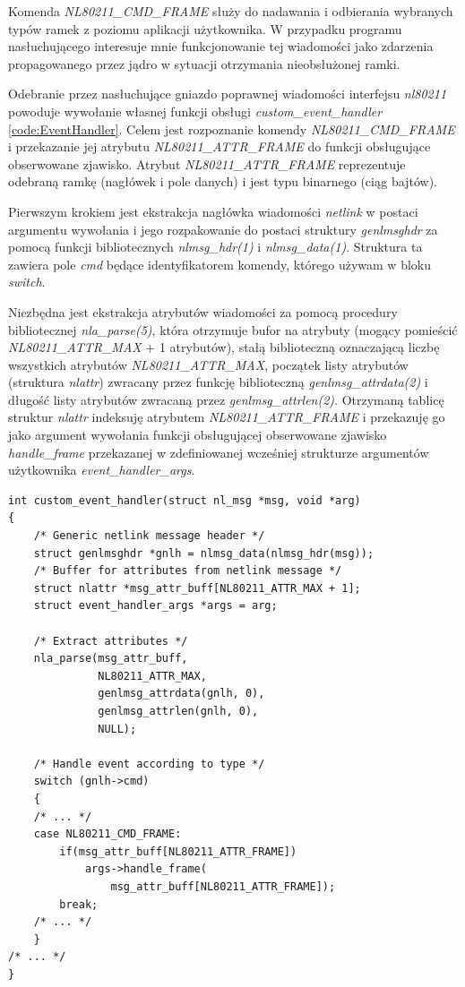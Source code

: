 Komenda \emph{NL80211\_CMD\_FRAME} służy do nadawania i odbierania wybranych typów ramek z poziomu aplikacji użytkownika. W przypadku programu nasłuchującego interesuje mnie funkcjonowanie tej wiadomości jako zdarzenia propagowanego przez jądro w sytuacji otrzymania nieobsłużonej ramki. 

Odebranie przez nasłuchujące gniazdo poprawnej wiadomości interfejsu \emph{nl80211} powoduje wywołanie własnej funkcji obsługi \emph{custom\_event\_handler} \ref{code:EventHandler}. Celem jest rozpoznanie komendy \emph{NL80211\_CMD\_FRAME} i przekazanie jej atrybutu \emph{NL80211\_ATTR\_FRAME} do funkcji obsługujące obserwowane zjawisko. Atrybut \emph{NL80211\_ATTR\_FRAME} reprezentuje odebraną ramkę (nagłówek i pole danych) i jest typu binarnego (ciąg bajtów). 

Pierwszym krokiem jest ekstrakcja nagłówka wiadomości \emph{netlink} w postaci argumentu wywołania i jego rozpakowanie  do postaci struktury \emph{genlmsghdr} za pomocą funkcji bibliotecznych \emph{nlmsg\_hdr(1)} i \emph{nlmsg\_data(1)}. Struktura ta zawiera pole \emph{cmd} będące identyfikatorem komendy, którego używam w bloku \emph{switch}.

Niezbędna jest ekstrakcja atrybutów wiadomości za pomocą procedury bibliotecznej \emph{nla\_parse(5)}, która otrzymuje bufor na atrybuty (mogący pomieścić \emph{NL80211\_ATTR\_MAX} + 1 atrybutów), stałą biblioteczną oznaczającą liczbę wszystkich atrybutów \emph{NL80211\_ATTR\_MAX}, początek listy atrybutów (struktura \emph{nlattr}) zwracany przez funkcję biblioteczną \emph{genlmsg\_attrdata(2)} i długość listy atrybutów zwracaną przez \emph{genlmsg\_attrlen(2)}. Otrzymaną tablicę struktur \emph{nlattr} indeksuję atrybutem \emph{NL80211\_ATTR\_FRAME} i przekazuję go jako argument wywołania funkcji obsługującej obserwowane zjawisko \emph{handle\_frame} przekazanej w zdefiniowanej wcześniej strukturze argumentów użytkownika \emph{event\_handler\_args}. 

\begin{lstlisting}[frame=tb]
int custom_event_handler(struct nl_msg *msg, void *arg)
{
    /* Generic netlink message header */
    struct genlmsghdr *gnlh = nlmsg_data(nlmsg_hdr(msg));
    /* Buffer for attributes from netlink message */
    struct nlattr *msg_attr_buff[NL80211_ATTR_MAX + 1];
    struct event_handler_args *args = arg;
        
    /* Extract attributes */
    nla_parse(msg_attr_buff, 
              NL80211_ATTR_MAX, 
              genlmsg_attrdata(gnlh, 0), 
              genlmsg_attrlen(gnlh, 0), 
              NULL);
        
    /* Handle event according to type */
    switch (gnlh->cmd) 
    {
    /* ... */
    case NL80211_CMD_FRAME:
        if(msg_attr_buff[NL80211_ATTR_FRAME])
            args->handle_frame(
                msg_attr_buff[NL80211_ATTR_FRAME]);
        break;
    /* ... */
    }
/* ... */
}
\end{lstlisting}

